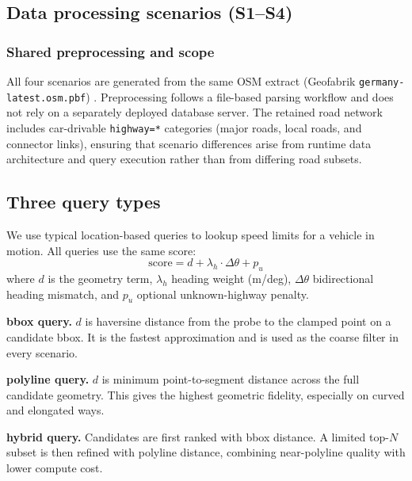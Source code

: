 \documentclass{article}
\begin{document}
\subsection{Data processing scenarios (S1--S4)}

\subsubsection{Shared preprocessing and scope}
All four scenarios are generated from the same OSM extract (Geofabrik \texttt{germany-latest.osm.pbf}) \cite{geofabrik2026}. Preprocessing follows a file-based parsing workflow \cite{pyosmium} and does not rely on a separately deployed database server. The retained road network includes car-drivable \texttt{highway=*} categories (major roads, local roads, and connector links), ensuring that scenario differences arise from runtime data architecture and query execution rather than from differing road subsets.


\subsection{Three query types}
We use typical location-based queries to lookup speed limits for a vehicle in motion. All queries use the same score:
\[
\text{score} = d + \lambda_h \cdot \Delta\theta + p_u
\]
where \(d\) is the geometry term, \(\lambda_h\) heading weight (\si{m/deg}), \(\Delta\theta\) bidirectional heading mismatch, and \(p_u\) optional unknown-highway penalty.

\textbf{bbox query.} \(d\) is haversine distance from the probe to the clamped point on a candidate bbox. It is the fastest approximation and is used as the coarse filter in every scenario.

\textbf{polyline query.} \(d\) is minimum point-to-segment distance across the full candidate geometry. This gives the highest geometric fidelity, especially on curved and elongated ways.

\textbf{hybrid query.} Candidates are first ranked with bbox distance. A limited top-\(N\) subset is then refined with polyline distance, combining near-polyline quality with lower compute cost.
\end{document}
